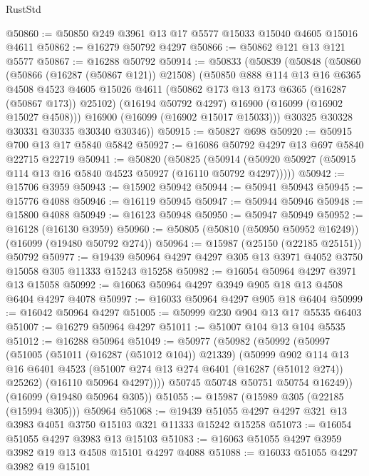 \begin{lexlean}{RustStd}
\begin{coremodule}
@50860 := @50850 @249 @3961 @13 @17 @5577 @15033 @15040 @4605 @15016 @4611
@50862 := @16279 @50792 @4297
@50866 := @50862 @121 @13 @121 @5577
@50867 := @16288 @50792
@50914 := @50833
    (@50839
      (@50848
        (@50860
          (@50866 (@16287 (@50867 @121)) @21508)
          (@50850
            @888
            @114
            @13
            @16
            @6365
            @4508
            @4523
            @4605
            @15026
            @4611
            (@50862 @173 @13 @173 @6365 (@16287 (@50867 @173)) @25102)
            (@16194 @50792 @4297)
            @16900
            (@16099 (@16902 @15027 @4508)))
          @16900
          (@16099 (@16902 @15017 @15033)))
        @30325
        @30328
        @30331
        @30335
        @30340
        @30346))
@50915 := @50827 @698
@50920 := @50915 @700 @13 @17 @5840 @5842
@50927 := @16086 @50792 @4297 @13 @697 @5840 @22715 @22719
@50941 := @50820
    (@50825 (@50914 (@50920 @50927 (@50915 @114 @13 @16 @5840 @4523 @50927 (@16110 @50792 @4297)))))
@50942 := @15706 @3959
@50943 := @15902 @50942
@50944 := @50941 @50943
@50945 := @15776 @4088
@50946 := @16119 @50945
@50947 := @50944 @50946
@50948 := @15800 @4088
@50949 := @16123 @50948
@50950 := @50947 @50949
@50952 := @16128 (@16130 @3959)
@50960 := @50805 (@50810 (@50950 @50952 @16249)) (@16099 (@19480 @50792 @274))
@50964 := @15987 (@25150 (@22185 @25151)) @50792
@50977 := @19439 @50964 @4297 @4297 @305 @13 @3971 @4052 @3750 @15058 @305 @11333 @15243 @15258
@50982 := @16054 @50964 @4297 @3971 @13 @15058
@50992 := @16063 @50964 @4297 @3949 @905 @18 @13 @4508 @6404 @4297 @4078
@50997 := @16033 @50964 @4297 @905 @18 @6404
@50999 := @16042 @50964 @4297
@51005 := @50999 @230 @904 @13 @17 @5535 @6403
@51007 := @16279 @50964 @4297
@51011 := @51007 @104 @13 @104 @5535
@51012 := @16288 @50964
@51049 := @50977
    (@50982
      (@50992
        (@50997
          (@51005
            (@51011 (@16287 (@51012 @104)) @21339)
            (@50999
              @902
              @114
              @13
              @16
              @6401
              @4523
              (@51007 @274 @13 @274 @6401 (@16287 (@51012 @274)) @25262)
              (@16110 @50964 @4297))))
        @50745
        @50748
        @50751
        @50754
        @16249))
    (@16099 (@19480 @50964 @305))
@51055 := @15987 (@15989 @305 (@22185 (@15994 @305))) @50964
@51068 := @19439 @51055 @4297 @4297 @321 @13 @3983 @4051 @3750 @15103 @321 @11333 @15242 @15258
@51073 := @16054 @51055 @4297 @3983 @13 @15103
@51083 := @16063 @51055 @4297 @3959 @3982 @19 @13 @4508 @15101 @4297 @4088
@51088 := @16033 @51055 @4297 @3982 @19 @15101

\end{coremodule}
\end{lexlean}
